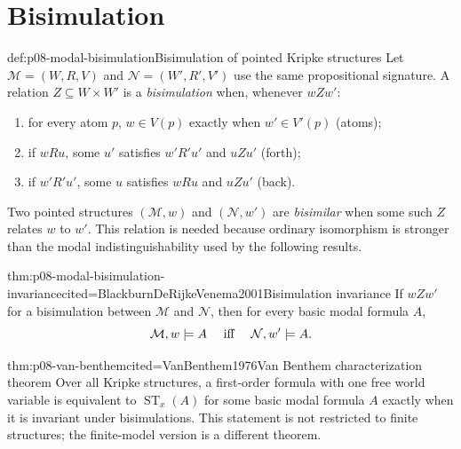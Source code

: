 \section{Bisimulation}

\begin{hbdefinition}{def:p08-modal-bisimulation}{Bisimulation of pointed Kripke structures}
Let \(\mathcal M=(W,R,V)\) and
\(\mathcal N=(W',R',V')\) use the same propositional signature.  A relation
\(Z\subseteq W\times W'\) is a \emph{bisimulation} when, whenever \(wZw'\):
\begin{enumerate}
\item for every atom \(p\), \(w\in V(p)\) exactly when \(w'\in V'(p)\)
      (atoms);
\item if \(wRu\), some \(u'\) satisfies \(w'R'u'\) and \(uZu'\) (forth);
\item if \(w'R'u'\), some \(u\) satisfies \(wRu\) and \(uZu'\) (back).
\end{enumerate}
Two pointed structures \((\mathcal M,w)\) and \((\mathcal N,w')\) are
\emph{bisimilar} when some such \(Z\) relates \(w\) to \(w'\).  This relation
is needed because ordinary isomorphism is stronger than the modal
indistinguishability used by the following results.
\end{hbdefinition}

\begin{hbtheorem}{thm:p08-modal-bisimulation-invariance}{cited=BlackburnDeRijkeVenema2001}{Bisimulation invariance}
If \(wZw'\) for a bisimulation between \(\mathcal M\) and \(\mathcal N\),
then for every basic modal formula \(A\),
\[
 \mathcal M,w\models A
 \quad\text{ iff }\quad
 \mathcal N,w'\models A.
\]
\end{hbtheorem}

\begin{hbtheorem}{thm:p08-van-benthem}{cited=VanBenthem1976}{Van Benthem characterization theorem}
Over all Kripke structures, a first-order formula with one free world variable
is equivalent to \(\operatorname{ST}_x(A)\) for some basic modal formula
\(A\) exactly when it is invariant under bisimulations.  This statement is not
restricted to finite structures; the finite-model version is a different
theorem.
\end{hbtheorem}

